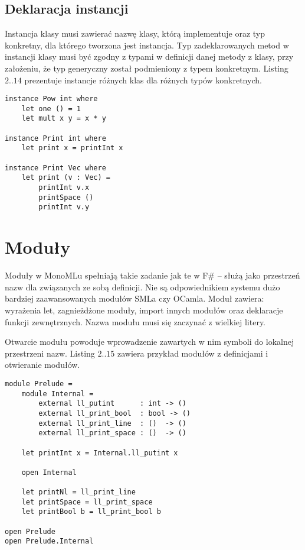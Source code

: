 \documentclass[declaration,shortabstract]{iithesis}
\begin{document}
\subsection{Deklaracja instancji}

Instancja klasy musi zawierać nazwę klasy, którą implementuje oraz typ konkretny,
dla którego tworzona jest instancja. Typ zadeklarowanych metod w
instancji klasy musi być zgodny z typami w definicji danej metody z klasy,
przy założeniu, że typ generyczny został podmieniony z typem konkretnym. 
Listing $2..14$ prezentuje instancje różnych klas dla różnych typów konkretnych.

\begin{lstlisting}[frame=single, caption=Instancja klasy.]
instance Pow int where
    let one () = 1 
    let mult x y = x * y

instance Print int where 
    let print x = printInt x 

instance Print Vec where 
    let print (v : Vec) = 
        printInt v.x 
        printSpace ()
        printInt v.y
\end{lstlisting}

\section{Moduły}

Moduły w MonoMLu spełniają takie zadanie jak te w F\# -- służą jako 
przestrzeń nazw dla związanych ze sobą definicji. Nie są odpowiednikiem 
systemu dużo bardziej zaawansowanych modułów SMLa czy OCamla.
Moduł zawiera: wyrażenia let, zagnieżdżone moduły, import innych 
modułów oraz deklaracje funkcji zewnętrznych. Nazwa modułu musi się zaczynać 
z wielkiej litery. 

Otwarcie modułu powoduje wprowadzenie zawartych w nim symboli do 
lokalnej przestrzeni nazw. Listing $2..15$ zawiera przykład modułów z definicjami 
i otwieranie modułów.

\begin{lstlisting}[frame=single, caption=Tworzenie i importowanie modułów.]
module Prelude = 
    module Internal = 
        external ll_putint      : int -> () 
        external ll_print_bool  : bool -> () 
        external ll_print_line  : ()  -> () 
        external ll_print_space : ()  -> () 

    let printInt x = Internal.ll_putint x

    open Internal 
    
    let printNl = ll_print_line
    let printSpace = ll_print_space
    let printBool b = ll_print_bool b

open Prelude
open Prelude.Internal
\end{lstlisting}
\end{document}
